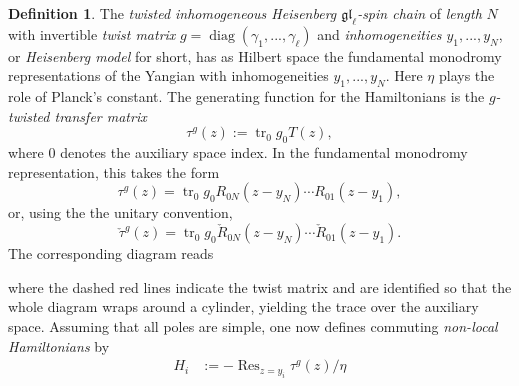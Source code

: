 \documentclass[11pt]{report}
\theoremstyle{definition}
\newtheorem{definition}[theorem]{Definition}
\theoremstyle{remark}
\theoremstyle{remark}
\begin{document}
\begin{definition}
The \emph{twisted inhomogeneous Heisenberg $\mathfrak{gl}_\ell$-spin chain} of \emph{length} $N$ with invertible \emph{twist matrix} $g = \operatorname{diag}(\gamma_1,...,\gamma_\ell)$ and \emph{inhomogeneities $y_1,...,y_N$}, or \emph{Heisenberg model} for short, has as Hilbert space the fundamental monodromy representations of the Yangian with inhomogeneities $y_1,...,y_N$. Here $\eta$ plays the role of Planck's constant. The generating function for the Hamiltonians is the \emph{$g$-twisted transfer matrix}
\begin{equation*}
\tau^g(z) := \operatorname{tr}_0 g_0 T(z),
\end{equation*}
where $0$ denotes the auxiliary space index. In the fundamental monodromy representation, this takes the form
\begin{equation*}
\tau^g(z) = \operatorname{tr}_0 g_0 R_{0N}(z-y_N) \cdots R_{01}(z-y_1),
\end{equation*}
or, using the the unitary convention,
\begin{equation*}
\check \tau^g(z) = \operatorname{tr}_0 g_0 \check R_{0N}(z-y_N) \cdots \check R_{01}(z-y_1).
\end{equation*}
The corresponding diagram reads
~\\
\begin{center}
\end{center}
where the dashed red lines indicate the twist matrix and are identified so that the whole diagram wraps around a cylinder, yielding the trace over the auxiliary space. Assuming that all poles are simple, one now defines commuting \emph{non-local Hamiltonians} by
\begin{align*}
H_i 
&:= -\operatorname{Res}_{z=y_i} \tau^g(z)/\eta \\

\end{align*}
\end{definition}
\end{document}

